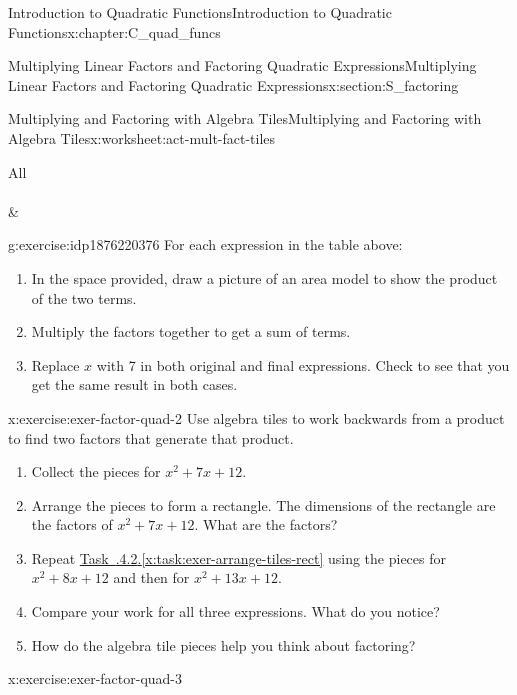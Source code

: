 \documentclass[oneside,10pt,]{book}
\makeatletter
\newcommand{\xreffont}{\relax}
\numberwithin{equation}{chapter}
\newcommand{\hrulethin}  {\noalign{\hrule height 0.04em}}
\newcommand{\tablecelllines}[3]%
{\begin{tabular}[#2]{@{}#1@{}}#3\end{tabular}}
\makeatother
\begin{document}
\begin{chapterptx}{Introduction to Quadratic Functions}{}{Introduction to Quadratic Functions}{}{}{x:chapter:C_quad_funcs}
\begin{sectionptx}{Multiplying Linear Factors and Factoring Quadratic Expressions}{}{Multiplying Linear Factors and Factoring Quadratic Expressions}{}{}{x:section:S_factoring}
\begin{worksheet-subsection}{Multiplying and Factoring with Algebra Tiles}{}{Multiplying and Factoring with Algebra Tiles}{}{}{x:worksheet:act-mult-fact-tiles}
\begin{center}
{\begin{tabular}{All}
{{\\
\\
}
}&\multicolumn{1}{lA}{\tablecelllines{l}{m}
{\((2x + 1)(x - 2)\)~~~~~~\\
\\
\\
\\
\\
\\
}
}\tabularnewline\hrulethin
\end{tabular}
}%
\end{center}%
\begin{divisionexercise}{1}{}{}{g:exercise:idp1876220376}%
For each expression in the table above:%
\begin{enumerate}[font=\bfseries,label=(\alph*),ref=\alph*]
\item{}In the space provided, draw a picture of an area model to show the product of the two terms.%
\item{}Multiply the factors together to get a sum of terms.%
\item{}Replace \(x\) with 7 in both original and final expressions. Check to see that you get the same result in both cases.%
\end{enumerate}
\end{divisionexercise}%
\begin{divisionexercise}{2}{}{}{x:exercise:exer-factor-quad-2}%
Use algebra tiles to work backwards from a product to find two factors that generate that product.%
\begin{enumerate}[font=\bfseries,label=(\alph*),ref=\alph*]
\item{}Collect the pieces for \(x^2 + 7x + 12\).%
\item\label{x:task:exer-arrange-tiles-rect}Arrange the pieces to form a rectangle. The dimensions of the rectangle are the factors of \(x^2 + 7x + 12\). What are the factors?%
\item{}Repeat \hyperref[x:task:exer-arrange-tiles-rect]{Task~{\xreffont 4.3.4.2}.{\xreffont\ref{x:task:exer-arrange-tiles-rect}}} using the pieces for \(x^2 + 8x + 12\) and then for \(x^2 + 13x + 12\).%
\item{}Compare your work for all three expressions. What do you notice?%
\item{}How do the algebra tile pieces help you think about factoring?%
\end{enumerate}
\end{divisionexercise}%
\begin{divisionexercise}{3}{}{}{x:exercise:exer-factor-quad-3}%

\end{divisionexercise}
\end{worksheet-subsection}
\end{sectionptx}
\end{chapterptx}
\end{document}
